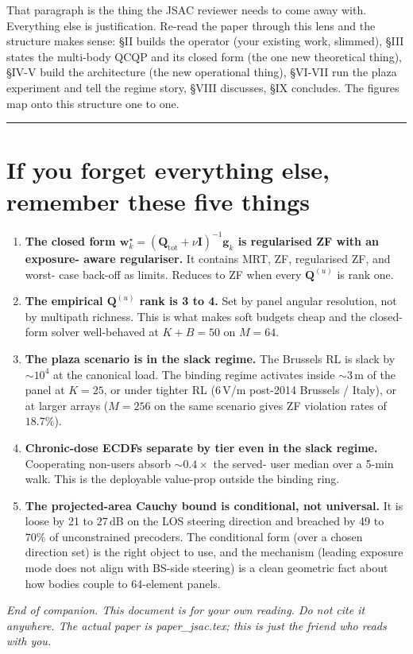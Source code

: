 \documentclass[11pt]{article}
\newcommand{\ww}{\mathbf{w}}
\newcommand{\gvec}{\mathbf{g}}
\newcommand{\Qmat}{\mathbf{Q}}
\begin{document}
That paragraph is the thing the JSAC reviewer needs to come away with.
Everything else is justification. Re-read the paper through this lens
and the structure makes sense: §II builds the operator (your existing
work, slimmed), §III states the multi-body QCQP and its closed form
(the one new theoretical thing), §IV-V build the architecture (the
new operational thing), §VI-VII run the plaza experiment and tell the
regime story, §VIII discusses, §IX concludes. The figures map onto
this structure one to one.

\bigskip\hrule\bigskip

\section*{If you forget everything else, remember these five things}

\begin{enumerate}[leftmargin=1.6em,itemsep=4pt]
  \item \textbf{The closed form $\ww_k^\star = (\Qmat_{\mathrm{tot}} +
  \nu \mathbf{I})^{-1} \gvec_k$ is regularised ZF with an exposure-
  aware regulariser.} It contains MRT, ZF, regularised ZF, and worst-
  case back-off as limits. Reduces to ZF when every $\Qmat^{(u)}$ is
  rank one.
  \item \textbf{The empirical $\Qmat^{(u)}$ rank is 3 to 4.} Set by
  panel angular resolution, not by multipath richness. This is what
  makes soft budgets cheap and the closed-form solver well-behaved at
  $K + B = 50$ on $M = 64$.
  \item \textbf{The plaza scenario is in the slack regime.} The
  Brussels RL is slack by $\sim 10^4$ at the canonical load. The
  binding regime activates inside $\sim 3\,$m of the panel at $K = 25$,
  or under tighter RL ($6\,$V/m post-2014 Brussels / Italy), or at
  larger arrays ($M = 256$ on the same scenario gives ZF violation
  rates of $18.7\%$).
  \item \textbf{Chronic-dose ECDFs separate by tier even in the slack
  regime.} Cooperating non-users absorb $\sim 0.4\times$ the served-
  user median over a 5-min walk. This is the deployable value-prop
  outside the binding ring.
  \item \textbf{The projected-area Cauchy bound is conditional, not
  universal.} It is loose by 21 to $27\,$dB on the LOS steering
  direction and breached by 49 to $70\%$ of unconstrained precoders.
  The conditional form (over a chosen direction set) is the right
  object to use, and the mechanism (leading exposure mode does not
  align with BS-side steering) is a clean geometric fact about how
  bodies couple to 64-element panels.
\end{enumerate}

\bigskip
\textit{End of companion. This document is for your own reading. Do
not cite it anywhere. The actual paper is paper\_jsac.tex; this is
just the friend who reads with you.}
\end{document}
